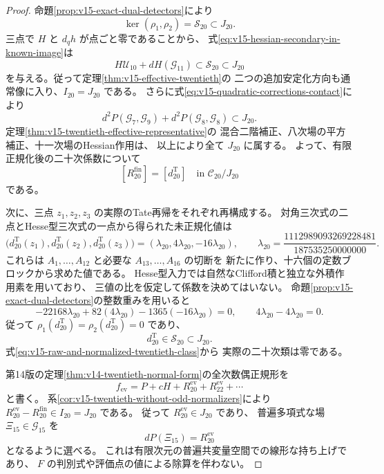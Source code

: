\begin{proof}
命題\ref{prop:v15-exact-dual-detectors}により
\[
 \ker(\rho_1,\rho_2)=\mathcal S_{20}\subset J_{20}.
\]
三点で $H$ と $d_qh$ が点ごと零であることから、
式\eqref{eq:v15-hessian-secondary-in-known-image}は
\[
 H\mathcal U_{10}+dH(\mathcal G_{11})
       \subset\mathcal S_{20}\subset J_{20}
\]
を与える。従って定理\ref{thm:v15-effective-twentieth}の
二つの追加安定化方向も通常像に入り、$I_{20}=J_{20}$ である。
さらに式\eqref{eq:v15-quadratic-corrections-contact}により
\[
 d^2P(\mathcal G_7,\mathcal G_9)
       +d^2P(\mathcal G_8,\mathcal G_8)\subset J_{20}.
\]
定理\ref{thm:v15-twentieth-effective-representative}の
混合二階補正、八次場の平方補正、十一次場のHessian作用は、
以上により全て $J_{20}$ に属する。
よって、有限正規化後の二十次係数について
\begin{equation}\label{eq:v15-raw-and-normalized-twentieth-class}
 [R_{20}^{\mathrm{fin}}]=[d_{20}^{\mathrm T}]
           \quad\text{in }\mathcal C_{20}/J_{20}
\end{equation}
である。

次に、三点 $z_1,z_2,z_3$ の実際のTate再帰をそれぞれ再構成する。
対角三次式の二点とHesse型三次式の一点から得られた未正規化値は
\begin{equation}\label{eq:v15-three-fresh-twentieth-values}
 \bigl(d_{20}^{\mathrm T}(z_1),d_{20}^{\mathrm T}(z_2),
                d_{20}^{\mathrm T}(z_3)\bigr)
       =(\lambda_{20},4\lambda_{20},-16\lambda_{20}),
 \qquad
 \lambda_{20}=\frac{1112989093269228481}{187535250000000}.
\end{equation}
これらは $A_1,\ldots,A_{12}$ と必要な $A_{13},\ldots,A_{16}$ の切断を
新たに作り、十六個の定数ブロックから求めた値である。
Hesse型入力では自然なClifford積と独立な外積作用素を用いており、
三値の比を仮定して係数を決めてはいない。
命題\ref{prop:v15-exact-dual-detectors}の整数重みを用いると
\[
 -22168\lambda_{20}+82(4\lambda_{20})
       -1365(-16\lambda_{20})=0,\qquad
 4\lambda_{20}-4\lambda_{20}=0.
\]
従って $\rho_1(d_{20}^{\mathrm T})=\rho_2(d_{20}^{\mathrm T})=0$ であり、
\[
 d_{20}^{\mathrm T}\in\mathcal S_{20}\subset J_{20}.
\]
式\eqref{eq:v15-raw-and-normalized-twentieth-class}から
実際の二十次類は零である。

第14版の定理\ref{thm:v14-twentieth-normal-form}の全次数偶正規形を
\[
 f_{\mathrm{ev}}=P+cH+R_{20}^{\mathrm{ev}}
                       +R_{22}^{\mathrm{ev}}+\cdots
\]
と書く。
系\ref{cor:v15-twentieth-without-odd-normalizers}により
$R_{20}^{\mathrm{ev}}-R_{20}^{\mathrm{fin}}\in I_{20}=J_{20}$ である。
従って $R_{20}^{\mathrm{ev}}\in J_{20}$ であり、
普遍多項式な場 $\Xi_{15}\in\mathcal G_{15}$ を
\[
 dP(\Xi_{15})=R_{20}^{\mathrm{ev}}
\]
となるように選べる。
これは有限次元の普遍共変量空間での線形な持ち上げであり、
$F$ の判別式や評価点の値による除算を伴わない。


\end{proof}
